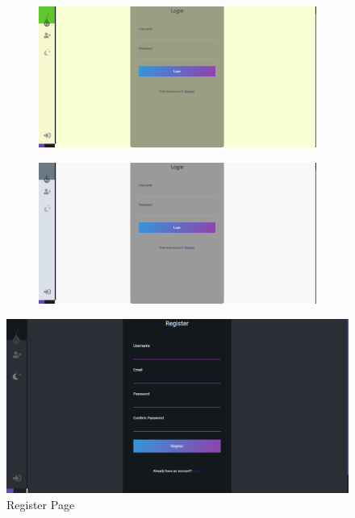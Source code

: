 \begin{figure}
      \centering
      \begin{subfigure}[H]{0.45\textwidth}
          \centering
          \includegraphics[width=\textwidth]{assets/screen-login-gr.png}
      \end{subfigure}
      \hfill
      \begin{subfigure}[H]{0.45\textwidth}
          \centering
          \includegraphics[width=\textwidth]{assets/screen-login-grey.png}
      \end{subfigure}
  
 \end{figure}





\begin{figure}[H]
      \centering
      \includegraphics[scale=0.45]{assets/screen-register-d.png}
      \caption{Register Page}
      \label{fig:register page}
\end{figure}

